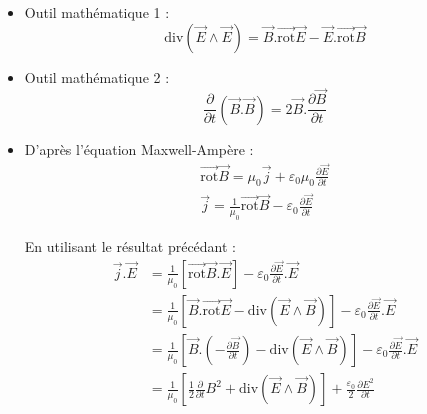 \begin{myproof}{}{}
\begin{itemize}

    \item Outil mathématique 1 : 
      \begin{equation}
        \mathrm{div} (\overrightarrow{E} \wedge \overrightarrow{E}) = \overrightarrow{B}. \overrightarrow{\mathrm{rot}} \overrightarrow{E} - \overrightarrow{E}. \overrightarrow{\mathrm{rot}}\overrightarrow{B}
      \end{equation} 

    \item Outil mathématique 2 : 
      \begin{equation}
        \frac{\partial }{\partial t} ( \overrightarrow{B}. \overrightarrow{B}) = 2 \overrightarrow{B}. \frac{\partial \overrightarrow{B}}{\partial t} 
      \end{equation}
    \item D'après l'équation Maxwell-Ampère : 
      \begin{gather}
        \overrightarrow{\mathrm{rot}} \overrightarrow{B} = \mu_0 \overrightarrow{j} + \varepsilon_0 \mu_0 \frac{\partial \overrightarrow{E}}{\partial t} \\ 
        \overrightarrow{j} = \frac{1}{\mu_0}  \overrightarrow{\mathrm{rot}} \overrightarrow{B} - \varepsilon_0 \frac{\partial  \overrightarrow{E}}{\partial t}
      \end{gather}

    En utilisant le résultat précédant : 
    \begin{align}
      \overrightarrow{j}. \overrightarrow{E} &= \frac{1}{\mu_0} [\overrightarrow{\mathrm{rot}}\overrightarrow{B}. \overrightarrow{E}] - \varepsilon_0 \frac{\partial \overrightarrow{E}}{\partial t} . \overrightarrow{E} \\ 
                                             &= \frac{1}{\mu_0} [\overrightarrow{B}. \overrightarrow{\mathrm{rot}} \overrightarrow{E} - \mathrm{div} ( \overrightarrow{E} \wedge \overrightarrow{B})] - \varepsilon_0 \frac{\partial \overrightarrow{E}}{\partial t} . \overrightarrow{E} \\ 
                                             &= \frac{1}{\mu_0} \left[ \overrightarrow{B}. \left( - \frac{\partial \overrightarrow{B}}{\partial t}  \right) - \mathrm{div} (\overrightarrow{E} \wedge \overrightarrow{B}) \right] - \varepsilon_0 \frac{\partial \overrightarrow{E}}{\partial t} . \overrightarrow{E} \\ 
                                             &= \frac{1}{\mu_0} \left[ \frac{1}{2} \frac{\partial }{\partial t} {B} ^{2} + \mathrm{div} (\overrightarrow{E} \wedge \overrightarrow{B}) \right] + \frac{\varepsilon_0}{2}  \frac{\partial E ^{2}                                            }{\partial t}
    \end{align}

\end{itemize}
\end{myproof}



